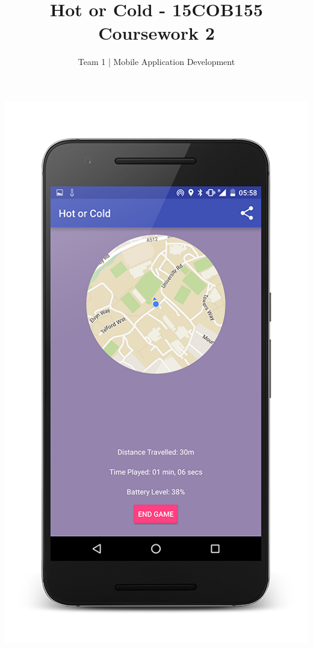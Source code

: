 \documentclass[10pt, a4paper]{article}
\begin{document}
\title{Hot or Cold - 15COB155 Coursework 2}
\author{Team 1 | Mobile Application Development}
\maketitle
\begin{center}
\includegraphics[height=0.82\textheight]{phone_game_2}
\end{center}
\newpage
\end{document}
